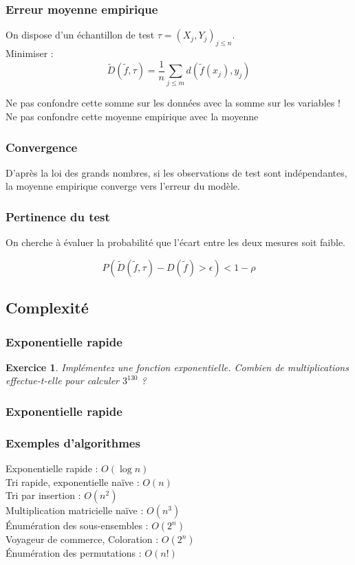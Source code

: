 \documentclass[11pt]{beamer}
\newenvironment{slide}[1]{%
\begin{frame}[environment=slide]
\frametitle{#1}
}{%
\end{frame}
}
\newtheorem{exercice}{Exercice}
\newcommand{\Python}[1]{
	{\small	}
}
\begin{document}
\begin{slide}{Erreur moyenne empirique}

On dispose d'un échantillon de test $\tau = (X_j,Y_j)_{j\leq n}$.\\

Minimiser :
$$\tilde{D}(\tilde{f},\tau) = \frac{1}{n}\sum_{j \leq m} d(\tilde{f}(x_j),y_j)$$

\pause

Ne pas confondre cette somme sur les données avec la somme sur les variables !\\
Ne pas confondre cette moyenne empirique avec la moyenne 
\end{slide}

\begin{slide}{Convergence}

D'après la loi des grands nombres, si les observations de test sont indépendantes, la moyenne empirique converge vers l'erreur du modèle.
\end{slide}

\begin{slide}{Pertinence du test}
On cherche à évaluer la probabilité que l'écart entre les deux mesures soit faible.

$$P\left(\tilde{D}(\tilde{f},\tau)-D(\tilde{f}) > \epsilon \right) < 1 - \rho$$

\end{slide}

\subsection{Complexité}

\begin{slide}{Exponentielle rapide}
\begin{exercice}
Implémentez une fonction exponentielle. Combien de multiplications effectue-t-elle pour calculer $3^{130}$ ?
\end{exercice}
\end{slide}

\begin{slide}{Exponentielle rapide}
\Python{fastexp}
\end{slide}


\begin{slide}{Exemples d'algorithmes}

Exponentielle rapide : $O(\log n)$\\
Tri rapide, exponentielle naïve : $O(n)$\\
Tri par insertion : $O(n^2)$\\
Multiplication matricielle naïve : $O(n^3)$\\
{\'E}numération des sous-ensembles : $O(2^n)$\\
Voyageur de commerce, Coloration : $O(2^n)$\\
{\'E}numération des permutations : $O(n!)$

\end{slide}
\end{document}

